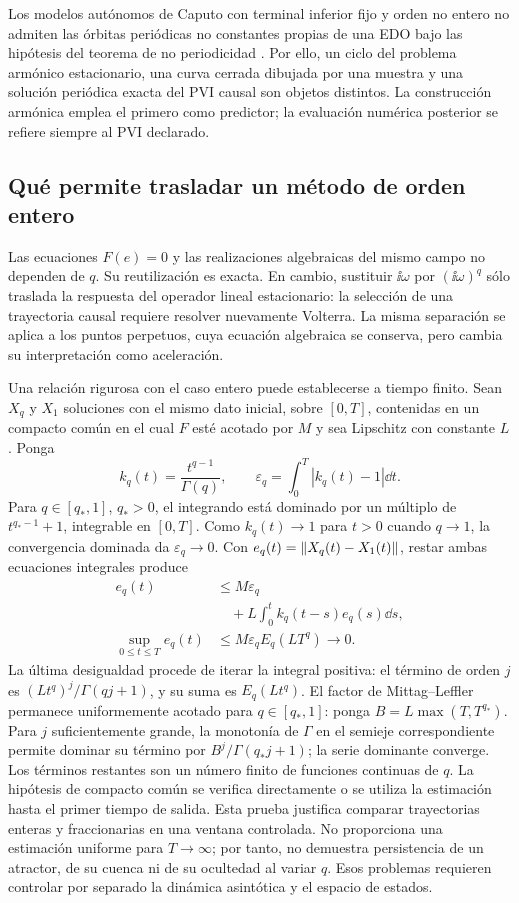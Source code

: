 Los modelos autónomos de Caputo con terminal inferior fijo y orden no
entero no admiten las órbitas periódicas no constantes propias de una EDO
bajo las hipótesis del teorema de no periodicidad
\cite{TavazoeiHaeri2009,AreaLosadaNieto2014}. Por ello, un ciclo del
problema armónico estacionario, una curva cerrada dibujada por una muestra
y una solución periódica exacta del PVI causal son objetos distintos.
La construcción armónica emplea el primero como predictor; la evaluación
numérica posterior se refiere siempre al PVI declarado.

\subsection{Qué permite trasladar un método de orden entero}
\label{bre:fund:transfermethods}

Las ecuaciones $F(e)=0$ y las realizaciones algebraicas del mismo campo no
dependen de $q$. Su reutilización es exacta. En cambio, sustituir
$\ii\omega$ por $(\ii\omega)^q$ sólo traslada la respuesta del operador
lineal estacionario: la selección de una trayectoria causal requiere
resolver nuevamente Volterra. La misma separación se aplica a los puntos
perpetuos, cuya ecuación algebraica se conserva, pero cambia su
interpretación como aceleración.

Una relación rigurosa con el caso entero puede establecerse a tiempo
finito. Sean $X_q$ y $X_1$ soluciones con el mismo dato inicial, sobre
$[0,T]$, contenidas en un compacto común en el cual $F$ esté acotado por
$M$ y sea Lipschitz con constante $L$. Ponga
\[
 k_q(t)=\frac{t^{q-1}}{\Gamma(q)},\qquad
 \varepsilon_q=\int_0^T|k_q(t)-1|\dd t.
\]
Para $q\in[q_*,1]$, $q_*>0$, el integrando está dominado por un múltiplo
de $t^{q_*-1}+1$, integrable en $[0,T]$. Como $k_q(t)\to1$ para
$t>0$ cuando $q\to1$, la convergencia dominada da
$\varepsilon_q\to0$. Con $e_q(t)=\left\lVert X_q(t)-X_1(t)\right\rVert$, restar ambas
ecuaciones integrales produce
\begin{align}
 e_q(t)
 &\le M\varepsilon_q\nonumber\\
 &\quad+L\int_0^t k_q(t-s)e_q(s)\dd s,\nonumber\\
 \sup_{0\le t\le T}e_q(t)
 &\le M\varepsilon_q E_q(LT^q)\longrightarrow0.
 \label{bre:fund:qtoone}
\end{align}
La última desigualdad procede de iterar la integral positiva:
el término de orden $j$ es
$(Lt^q)^j/\Gamma(qj+1)$, y su suma es $E_q(Lt^q)$.
El factor de Mittag--Leffler permanece uniformemente acotado para
$q\in[q_*,1]$: ponga $B=L\max(T,T^{q_*})$. Para $j$ suficientemente
grande, la monotonía de $\Gamma$ en el semieje correspondiente permite
dominar su término por $B^j/\Gamma(q_*j+1)$; la serie dominante converge.
Los términos restantes son un número finito de funciones continuas de $q$.
La hipótesis de compacto común se verifica directamente o se utiliza la
estimación hasta el primer tiempo de salida. Esta prueba justifica
comparar trayectorias enteras y fraccionarias en una ventana controlada.
No proporciona una estimación uniforme para $T\to\infty$; por tanto, no
demuestra persistencia de un atractor, de su cuenca ni de su ocultedad al
variar $q$. Esos problemas requieren controlar por separado la dinámica
asintótica y el espacio de estados.

